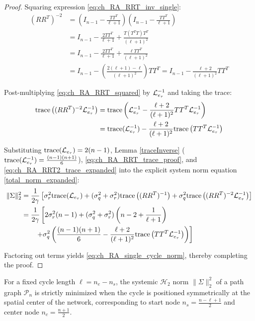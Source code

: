 \begin{proof}
Squaring expression \eqref{eq:ch_RA_RRT_inv_single}:
\begin{align}\label{eq:ch_RA_RRT_squared}
	(R R^T)^{-2} &= \left( I_{n-1} - \frac{T T^T}{\ell+1} \right) \left( I_{n-1} - \frac{T T^T}{\ell+1} \right) \nonumber \\
	&= I_{n-1} - \frac{2 T T^T}{\ell+1} + \frac{T (T^T T) T^T}{(\ell+1)^2} \nonumber \\
	&= I_{n-1} - \frac{2 T T^T}{\ell+1} + \frac{\ell T T^T}{(\ell+1)^2} \nonumber \\
	&= I_{n-1} - \left( \frac{2(\ell+1) - \ell}{(\ell+1)^2} \right) T T^T = I_{n-1} - \frac{\ell+2}{(\ell+1)^2} T T^T
\end{align}

Post-multiplying \eqref{eq:ch_RA_RRT_squared} by $\mathcal{L}_{e_{\tau}}^{-1}$ and taking the trace:
\begin{align}\label{eq:ch_RA_RRT2_trace_expanded}
	\text{trace}\left( (R R^T)^{-2} \mathcal{L}_{e_{\tau}}^{-1} \right) &= \text{trace}\left( \mathcal{L}_{e_{\tau}}^{-1} - \frac{\ell+2}{(\ell+1)^2} T T^T \mathcal{L}_{e_{\tau}}^{-1} \right) \nonumber \\
	&= \text{trace}(\mathcal{L}_{e_{\tau}}^{-1}) - \frac{\ell+2}{(\ell+1)^2} \text{trace}\left( T T^T \mathcal{L}_{e_{\tau}}^{-1} \right)
\end{align}

Substituting $\text{trace}(\mathcal{L}_{e_{\tau}}) = 2(n-1)$, Lemma \ref{traceInverse} ($\text{trace}(\mathcal{L}_{e_{\tau}}^{-1}) = \frac{(n-1)(n+1)}{6}$), \eqref{eq:ch_RA_RRT_trace_proof}, and \eqref{eq:ch_RA_RRT2_trace_expanded} into the explicit system norm equation \eqref{total_norm_expanded}:
\begin{align}\label{single_cycle_norm_proof_step}
	\|\Sigma\|_2^2 &= \frac{1}{2\gamma} \left[ \sigma_r^2 \text{trace}(\mathcal{L}_{e_{\tau}}) + (\sigma_q^2 + \sigma_r^2) \text{trace}\left((RR^T)^{-1}\right) + \sigma_q^2 \text{trace}\left( (RR^T)^{-2} \mathcal{L}_{e_{\tau}}^{-1} \right) \right] \nonumber \\
	&= \frac{1}{2\gamma} \left[ 2\sigma_r^2(n-1) + (\sigma_q^2 + \sigma_r^2)\left(n - 2 + \frac{1}{\ell+1}\right) \right. \nonumber \\
	&\quad \quad \left. + \sigma_q^2 \left( \frac{(n-1)(n+1)}{6} - \frac{\ell+2}{(\ell+1)^2} \text{trace}\left( T T^T \mathcal{L}_{e_{\tau}}^{-1} \right) \right) \right]
\end{align}

Factoring out terms yields \eqref{eq:ch_RA_single_cycle_norm}, thereby completing the proof.
\end{proof}

\begin{theo}\label{thm:ch_RA_single_cycle_location}
For a fixed cycle length $\ell = n_e - n_s$, the systemic $\mathcal{H}_2$ norm $\|\Sigma\|_2^2$ of a path graph $\mathcal{P}_n$ is strictly minimized when the cycle is positioned symmetrically at the spatial center of the network, corresponding to start node $n_s = \frac{n-\ell+1}{2}$ and center node $n_c = \frac{n+1}{2}$.
\end{theo}

